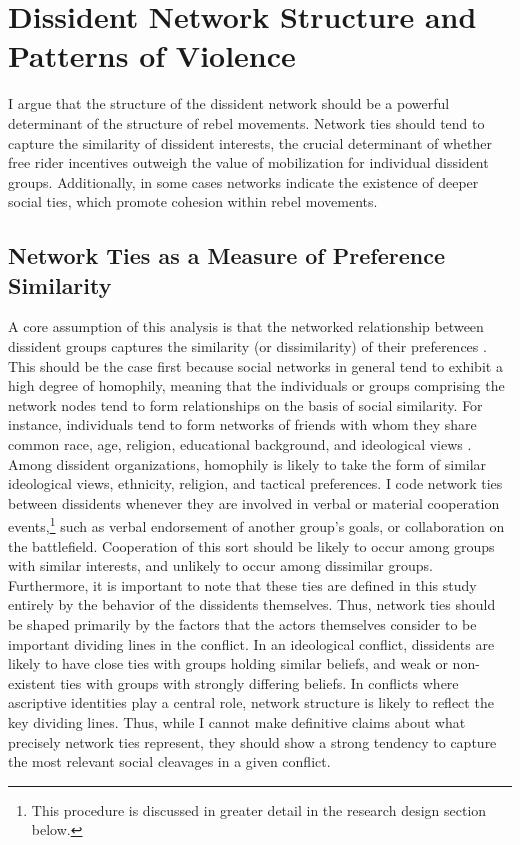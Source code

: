 \section{Dissident Network Structure and Patterns of Violence}

I argue that the structure of the dissident network should be a powerful determinant of the structure of rebel movements. Network ties should tend to capture the similarity of dissident interests, the crucial determinant of whether free rider incentives outweigh the value of mobilization for individual dissident groups. Additionally, in some cases networks indicate the existence of deeper social ties, which promote cohesion within rebel movements.

\subsection{Network Ties as a Measure of Preference Similarity}

A core assumption of this analysis is that the networked relationship between dissident groups captures the similarity (or dissimilarity) of their preferences \citep[a similar assumption is made by][]{Metternich2013}. This should be the case first because social networks in general tend to exhibit a high degree of homophily, meaning that the individuals or groups comprising the network nodes tend to form relationships on the basis of social similarity. For instance, individuals tend to form networks of friends with whom they share common race, age, religion, educational background, and ideological views \citep{Mcpherson2001}. Among dissident organizations, homophily is likely to take the form of similar ideological views, ethnicity, religion, and tactical preferences. I code network ties between dissidents whenever they are involved in verbal or material cooperation events,\footnote{This procedure is discussed in greater detail in the research design section below.} such as verbal endorsement of another group's goals, or collaboration on the battlefield. Cooperation of this sort should be likely to occur among groups with similar interests, and unlikely to occur among dissimilar groups. Furthermore, it is important to note that these ties are defined in this study entirely by the behavior of the dissidents themselves. Thus, network ties should be shaped primarily by the factors that the actors themselves consider to be important dividing lines in the conflict. In an ideological conflict, dissidents are likely to have close ties with groups holding similar beliefs, and weak or non-existent ties with groups with strongly differing beliefs. In conflicts where ascriptive identities play a central role, network structure is likely to reflect the key dividing lines. Thus, while I cannot make definitive claims about what precisely network ties represent, they should show a strong tendency to capture the most relevant social cleavages in a given conflict.

